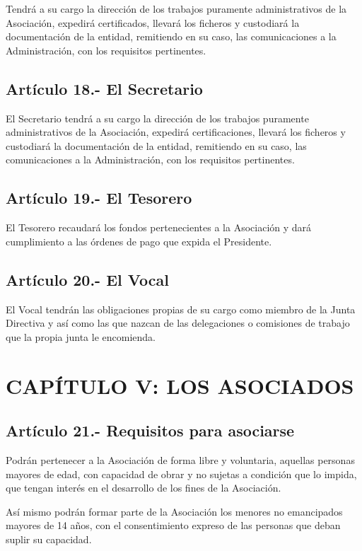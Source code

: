 \documentclass[12pt]{article}
\begin{document}
Tendrá a su cargo la dirección de los trabajos puramente administrativos de la Asociación, expedirá certificados, llevará los ficheros y custodiará la documentación de la entidad, remitiendo en su caso, las comunicaciones a la Administración, con los requisitos pertinentes.

\subsection{Artículo 18.- El Secretario}
El Secretario tendrá a su cargo la dirección de los trabajos puramente administrativos de la Asociación, expedirá certificaciones, llevará los ficheros y custodiará la documentación de la entidad, remitiendo en su caso, las comunicaciones a la Administración, con los requisitos pertinentes.

\subsection{Artículo 19.- El Tesorero}
El Tesorero recaudará los fondos pertenecientes a la Asociación y dará cumplimiento a las órdenes de pago que expida el Presidente.

\subsection{Artículo 20.- El Vocal}
El Vocal tendrán las obligaciones propias de su cargo como miembro de la Junta Directiva y así como las que nazcan de las delegaciones o comisiones de trabajo que la propia junta le encomienda.


\section{CAPÍTULO V: LOS ASOCIADOS}


\subsection{Artículo 21.- Requisitos para asociarse}
Podrán pertenecer a la Asociación de forma libre y voluntaria, aquellas personas mayores de edad, con capacidad de obrar y no sujetas a condición que lo impida, que tengan interés en el desarrollo de los fines de la Asociación.

Así mismo podrán formar parte de la Asociación los menores no emancipados mayores de 14 años, con el consentimiento expreso de las personas que deban suplir su capacidad.
\end{document}
